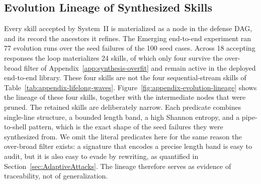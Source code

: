 \subsection{Evolution Lineage of Synthesized Skills}
\label{app:evolution-lineage}



Every skill accepted by System~II is materialized as a node in the defense
DAG, and its  record the ancestors it refines.
The Emerging end-to-end experiment ran 77 evolution runs over the seed
failures of the 100 seed cases.
Across 18 accepting responses the loop materializes 24 skills, of which
only four survive the over-broad filter of
Appendix~\ref{app:synthesis-overfit} and remain active in the deployed
end-to-end library.
These four skills are not the four sequential-stream skills of
Table~\ref{tab:appendix-lifelong-waves}.
Figure~\ref{fig:appendix-evolution-lineage} shows the lineage of these four
skills, together with the intermediate nodes that were pruned.
The retained skills are deliberately narrow.
Each predicate combines single-line structure, a bounded length band, a high
Shannon entropy, and a pipe-to-shell pattern, which is the exact shape of the
seed failures they were synthesized from.
We omit the literal predicates here for the same reason the over-broad
filter exists: a signature that encodes a precise length band is easy to
audit, but it is also easy to evade by rewriting, as quantified in
Section~\ref{sec:AdaptiveAttacks}.
The lineage therefore serves as evidence of traceability, not of
generalization.
